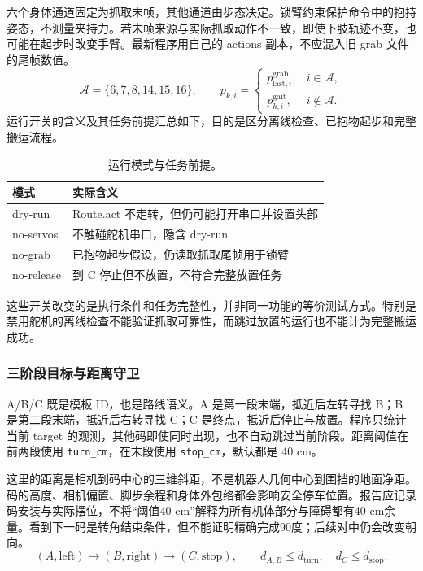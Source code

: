 六个身体通道固定为抓取末帧，其他通道由步态决定。锁臂约束保护命令中的抱持姿态，不测量夹持力。若末帧来源与实际抓取动作不一致，即使下肢轨迹不变，也可能在起步时改变手臂。最新程序用自己的 actions 副本，不应混入旧 grab 文件的尾帧数值。
\begin{equation}
\mathcal A=\{6,7,8,14,15,16\},\qquad p_{k,i}=\begin{cases}p_{\mathrm{last},i}^{\mathrm{grab}},&i\in\mathcal A,\\p_{k,i}^{\mathrm{gait}},&i\notin\mathcal A.\end{cases}
\end{equation}
运行开关的含义及其任务前提汇总如下，目的是区分离线检查、已抱物起步和完整搬运流程。
\begin{table}[H]\centering\small\begin{tabularx}{\linewidth}{p{30mm}Y}\toprule 模式 & 实际含义\\\midrule
dry-run & Route.act 不走转，但仍可能打开串口并设置头部\\
no-servos & 不触碰舵机串口，隐含 dry-run\\
no-grab & 已抱物起步假设，仍读取抓取尾帧用于锁臂\\
no-release & 到 C 停止但不放置，不符合完整放置任务\\\bottomrule\end{tabularx}\caption{运行模式与任务前提。}\end{table}

这些开关改变的是执行条件和任务完整性，并非同一功能的等价测试方式。特别是禁用舵机的离线检查不能验证抓取可靠性，而跳过放置的运行也不能计为完整搬运成功。


\subsubsection{三阶段目标与距离守卫}
A/B/C 既是模板 ID，也是路线语义。A 是第一段末端，抵近后左转寻找 B；B 是第二段末端，抵近后右转寻找 C；C 是终点，抵近后停止与放置。程序只统计当前 target 的观测，其他码即使同时出现，也不自动跳过当前阶段。距离阈值在前两段使用 \texttt{turn\_\allowbreak cm}，在末段使用 \texttt{stop\_\allowbreak cm}，默认都是 40 cm。

这里的距离是相机到码中心的三维斜距，不是机器人几何中心到围挡的地面净距。码的高度、相机偏置、脚步余程和身体外包络都会影响安全停车位置。报告应记录码安装与实际摆位，不将“阈值40 cm”解释为所有机体部分与障碍都有40 cm余量。看到下一码是转角结束条件，但不能证明精确完成90度；后续对中仍会改变朝向。
\begin{equation}
(A,\mathrm{left})\rightarrow(B,\mathrm{right})\rightarrow(C,\mathrm{stop}),\qquad d_{A,B}\le d_{\mathrm{turn}},\quad d_C\le d_{\mathrm{stop}}.
\end{equation}

